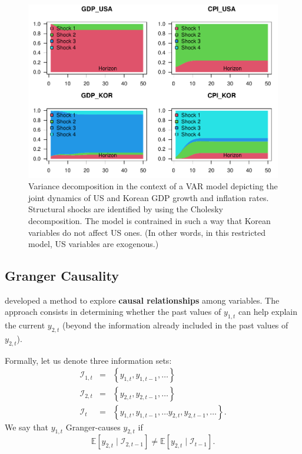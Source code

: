 \documentclass[
  12pt,
]{book}
\theoremstyle{definition}
\theoremstyle{definition}
\theoremstyle{definition}
\theoremstyle{definition}
\theoremstyle{remark}
\begin{document}
\begin{figure}
\includegraphics[width=0.95\linewidth]{IdentifStructShocks_files/figure-latex/VARdecblockexogCH-1} \caption{Variance decomposition in the context of a VAR model depicting the joint dynamics of US and Korean GDP growth and inflation rates. Structural shocks are identified by using the Cholesky decomposition. The model is contrained in such a way that Korean variables do not affect US ones. (In other words, in this restricted model, US variables are exogenous.)}\label{fig:VARdecblockexogCH}
\end{figure}

\subsection{Granger Causality}\label{granger-causality}

\citet{Granger_1969} developed a method to explore \textbf{causal relationships} among variables. The approach consists in determining whether the past values of \(y_{1,t}\) can help explain the current \(y_{2,t}\) (beyond the information already included in the past values of \(y_{2,t}\)).

Formally, let us denote three information sets:
\begin{eqnarray*}
\mathcal{I}_{1,t} & = & \left\{ y_{1,t},y_{1,t-1},\ldots\right\} \\
\mathcal{I}_{2,t} & = & \left\{ y_{2,t},y_{2,t-1},\ldots\right\} \\
\mathcal{I}_{t} & = & \left\{ y_{1,t},y_{1,t-1},\ldots y_{2,t},y_{2,t-1},\ldots\right\}.
\end{eqnarray*}
We say that \(y_{1,t}\) Granger-causes \(y_{2,t}\) if
\[
\mathbb{E}\left[y_{2,t}\mid \mathcal{I}_{2,t-1}\right]\neq \mathbb{E}\left[y_{2,t}\mid \mathcal{I}_{t-1}\right].
\]
\end{document}
